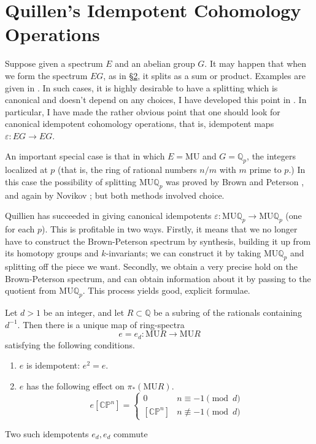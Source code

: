 \documentclass[../main]{subfiles}
\begin{document}
\label{sec:p2c15}
\chapter{Quillen's Idempotent Cohomology Operations}
Suppose given a spectrum $E$ and an abelian group $G$. It may happen that when we form the spectrum $EG$, as in \hyperref[sec:p2c2]{\S 2}, it splits as a sum or product. Examples are given in \cite[Lecture 4]{adams3}. In such cases, it is highly desirable to have a splitting which is canonical and doesn't depend on any choices, I have developed this point in \cite[Lecture 4]{adams3}. In particular, I have made the rather obvious point that one should look for canonical idempotent cohomology operations, that is, idempotent maps
$\varepsilon:EG\longrightarrow EG$.

An important special case is that in which $E = \mathrm{MU}$ and $G=\mathbb{Q}_p$, the integers localized at $p$ (that is, the ring of rational numbers $n/m$ with $m$ prime to $p$.) In this case the possibility of splitting $\mathrm{MU}\mathbb{Q}_p$ was proved by Brown and Peterson \cite{brownpeterson}, and again by Novikov \cite{novikov}; but both methods involved choice.

Quillien has succeeded in giving canonical idempotents $\varepsilon:\mathrm{MU}\mathbb{Q}_p\longrightarrow \mathrm{MU}\mathbb{Q}_p$ (one for each $p$). This is profitable in two ways. Firstly, it means that we no longer have to construct the Brown-Peterson spectrum by synthesis, building it up from its homotopy groups and $k$-invariants; we can construct it by taking $\mathrm{MU}\mathbb{Q}_p$ and splitting off the piece we want. Secondly, we obtain a very precise hold on the Brown-Peterson spectrum, and can obtain information about it by passing to the quotient from $\mathrm{MU}\mathbb{Q}_p$. This process yields good, explicit formulae.

\begin{theorem}
\label{thm:p2c15.1}
Let $d>1$ be an integer, and let $R\subset\mathbb{Q}$ be a subring of the rationals containing $d^{-1}$. Then there is a unique map of ring-spectra $$e=e_d:\mathrm{MU}R\to \mathrm{MU}R$$ satisfying the following conditions.
\begin{enumerate}
    \item $e$ is idempotent: $e^2=e$.
    \item $e$ has the following effect on $\pi_\ast(\mathrm{MU}R)$. 
    $$e[\mathbb{CP}^n]=
        \begin{cases}
            0 & n\equiv-1\pmod{d}\\
            [\mathbb{CP}^n] & n\not\equiv-1\pmod{d}
        \end{cases}$$
\end{enumerate}
Two such idempotents $e_d,e_d$ commute
\end{theorem}
\end{document}
